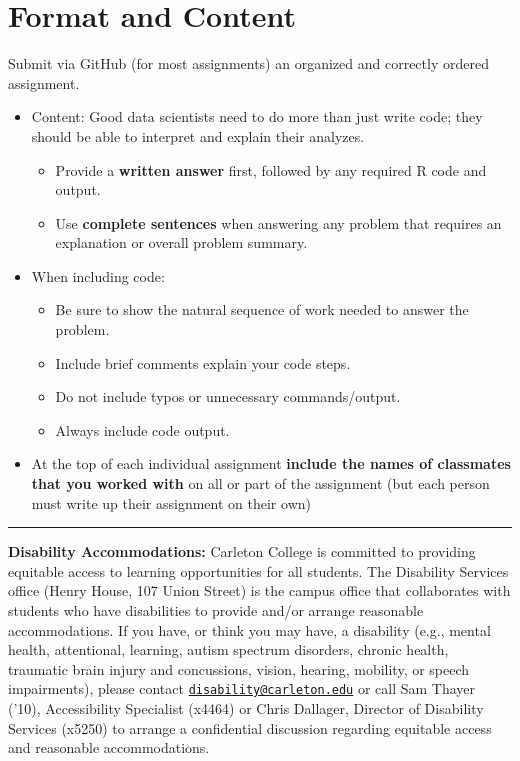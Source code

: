 \documentclass[
]{book}
\providecommand{\tightlist}{%
  \setlength{\itemsep}{0pt}\setlength{\parskip}{0pt}}
\begin{document}
\hypertarget{format-and-content}{%
\section{Format and Content}\label{format-and-content}}

Submit via GitHub (for most assignments) an organized and correctly
ordered assignment.

\begin{itemize}
\tightlist
\item
  Content: Good data scientists need to do more than just write code;
  they should be able to interpret and explain their analyzes.

  \begin{itemize}
  \tightlist
  \item
    Provide a \textbf{written answer} first, followed by any required R
    code and output.\\
  \item
    Use \textbf{complete sentences} when answering any problem that
    requires an explanation or overall problem summary.
  \end{itemize}
\item
  When including code:

  \begin{itemize}
  \tightlist
  \item
    Be sure to show the natural sequence of work needed to answer
    the problem.
  \item
    Include brief comments explain your code steps.
  \item
    Do not include typos or unnecessary commands/output.
  \item
    Always include code output.
  \end{itemize}
\item
  At the top of each individual assignment \textbf{include the names of
  classmates that you worked with} on all or part of the assignment
  (but each person must write up their assignment on their own)
\end{itemize}

\begin{center}\rule{0.5\linewidth}{0.5pt}\end{center}

\textbf{Disability Accommodations:} Carleton College is committed to
providing equitable access to learning opportunities for all students.
The Disability Services office (Henry House, 107 Union Street) is the
campus office that collaborates with students who have disabilities to
provide and/or arrange reasonable accommodations. If you have, or think
you may have, a disability (e.g., mental health, attentional, learning,
autism spectrum disorders, chronic health, traumatic brain injury and
concussions, vision, hearing, mobility, or speech impairments), please
contact \href{mailto:disability@carleton.edu}{\nolinkurl{disability@carleton.edu}} or call Sam Thayer ('10),
Accessibility Specialist (x4464) or Chris Dallager, Director of
Disability Services (x5250) to arrange a confidential discussion
regarding equitable access and reasonable accommodations.
\end{document}

